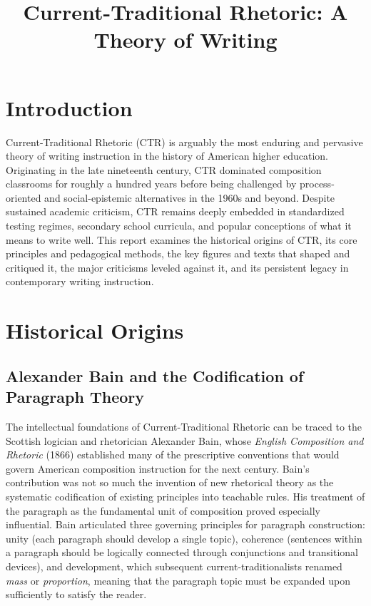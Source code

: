 \documentclass[12pt]{article}
\title{Current-Traditional Rhetoric: A Theory of Writing}
\author{}
\date{}
\begin{document}
\maketitle

\section*{Introduction}

Current-Traditional Rhetoric (CTR) is arguably the most enduring and pervasive theory of writing instruction in the history of American higher education. Originating in the late nineteenth century, CTR dominated composition classrooms for roughly a hundred years before being challenged by process-oriented and social-epistemic alternatives in the 1960s and beyond. Despite sustained academic criticism, CTR remains deeply embedded in standardized testing regimes, secondary school curricula, and popular conceptions of what it means to write well. This report examines the historical origins of CTR, its core principles and pedagogical methods, the key figures and texts that shaped and critiqued it, the major criticisms leveled against it, and its persistent legacy in contemporary writing instruction.

\section{Historical Origins}

\subsection{Alexander Bain and the Codification of Paragraph Theory}

The intellectual foundations of Current-Traditional Rhetoric can be traced to the Scottish logician and rhetorician Alexander Bain, whose \textit{English Composition and Rhetoric} (1866) established many of the prescriptive conventions that would govern American composition instruction for the next century. Bain's contribution was not so much the invention of new rhetorical theory as the systematic codification of existing principles into teachable rules. His treatment of the paragraph as the fundamental unit of composition proved especially influential. Bain articulated three governing principles for paragraph construction: unity (each paragraph should develop a single topic), coherence (sentences within a paragraph should be logically connected through conjunctions and transitional devices), and development, which subsequent current-traditionalists renamed \textit{mass} or \textit{proportion}, meaning that the paragraph topic must be expanded upon sufficiently to satisfy the reader.
\end{document}
